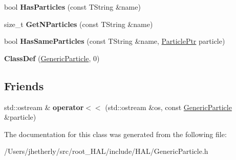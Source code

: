 \begin{DoxyCompactItemize}
\item 
\hypertarget{class_h_a_l_1_1_generic_particle_ac0f562c1225127b099ef7df56ae3177d}{bool {\bfseries Has\+Particles} (const T\+String \&name)}\label{class_h_a_l_1_1_generic_particle_ac0f562c1225127b099ef7df56ae3177d}

\item 
\hypertarget{class_h_a_l_1_1_generic_particle_afddc36ec1e6dad1c155449386ea716b6}{size\+\_\+t {\bfseries Get\+N\+Particles} (const T\+String \&name)}\label{class_h_a_l_1_1_generic_particle_afddc36ec1e6dad1c155449386ea716b6}

\item 
\hypertarget{class_h_a_l_1_1_generic_particle_a968d9fb1e1800b48182055ec8df38e39}{bool {\bfseries Has\+Same\+Particles} (const T\+String \&name, \hyperlink{class_h_a_l_1_1_generic_particle}{Particle\+Ptr} particle)}\label{class_h_a_l_1_1_generic_particle_a968d9fb1e1800b48182055ec8df38e39}

\item 
\hypertarget{class_h_a_l_1_1_generic_particle_ad23fc850d01f55da3b3c27366504289e}{{\bfseries Class\+Def} (\hyperlink{class_h_a_l_1_1_generic_particle}{Generic\+Particle}, 0)}\label{class_h_a_l_1_1_generic_particle_ad23fc850d01f55da3b3c27366504289e}

\end{DoxyCompactItemize}
\subsection*{Friends}
\begin{DoxyCompactItemize}
\item 
\hypertarget{class_h_a_l_1_1_generic_particle_a21417ca06cb919c843aa8c97cd734c1e}{std\+::ostream \& {\bfseries operator$<$$<$} (std\+::ostream \&os, const \hyperlink{class_h_a_l_1_1_generic_particle}{Generic\+Particle} \&particle)}\label{class_h_a_l_1_1_generic_particle_a21417ca06cb919c843aa8c97cd734c1e}

\end{DoxyCompactItemize}


The documentation for this class was generated from the following file\+:\begin{DoxyCompactItemize}
\item 
/\+Users/jhetherly/src/root\+\_\+\+H\+A\+L/include/\+H\+A\+L/Generic\+Particle.\+h\end{DoxyCompactItemize}
